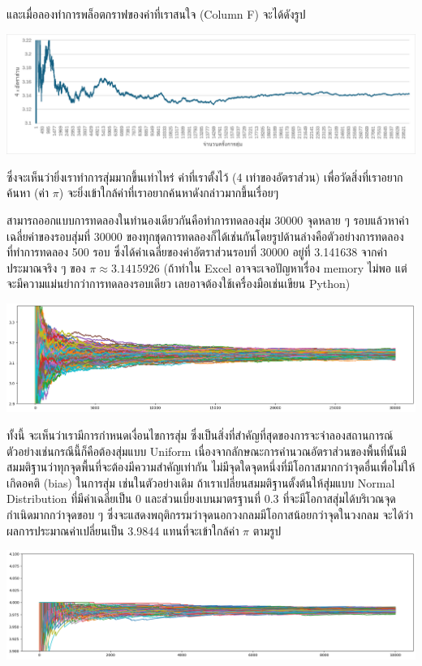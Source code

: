และเมื่อลองทำการพล็อตกราฟของค่าที่เราสนใจ (Column F) จะได้ดังรูป
\begin{center}
    \includegraphics[width=\linewidth]{ratioToPi.png}
\end{center}
ซึ่งจะเห็นว่ายิ่งเราทำการสุ่มมากขึ้นเท่าไหร่ ค่าที่เราตั้งไว้ (4 เท่าของอัตราส่วน) เพื่อวัดสิ่งที่เราอยากค้นหา (ค่า $\pi$) จะยิ่งเข้าใกล้ค่าที่เราอยากค้นหาดังกล่าวมากขึ้นเรื่อยๆ

สามารถออกแบบการทดลองในทำนองเดียวกันคือทำการทดลองสุ่ม 30000 จุดหลาย ๆ รอบแล้วหาค่าเฉลี่ยค่าของรอบสุ่มที่ 30000 ของทุกชุดการทดลองก็ได้เช่นกันโดยรูปด้านล่างคือตัวอย่างการทดลองที่ทำการทดลอง 500 รอบ ซึ่งได้ค่าเฉลี่ยของค่าอัตราส่วนรอบที่ 30000 อยู่ที่ 3.141638 จากค่าประมาณจริง ๆ ของ $\pi\approx 3.1415926$ (ถ้าทำใน Excel อาจจะเจอปัญหาเรื่อง memory ไม่พอ แต่จะมีความแม่นยำกว่าการทดลองรอบเดียว เลยอาจต้องใช้เครื่องมือเช่นเขียน Python)
\begin{center}
    \includegraphics[width=1\linewidth]{SimulatePi.png}
\end{center}

ทั้งนี้ จะเห็นว่าเรามีการกำหนดเงื่อนไขการสุ่ม ซึ่งเป็นสิ่งที่สำคัญที่สุดของการจะจำลองสถานการณ์ ตัวอย่างเช่นกรณีนี้ก็คือต้องสุ่มแบบ Uniform เนื่องจากลักษณะการคำนวณอัตราส่วนของพื้นที่นั้นมีสมมติฐานว่าทุกจุดพื้นที่จะต้องมีความสำคัญเท่ากัน ไม่มีจุดใดจุดหนึ่งที่มีโอกาสมากกว่าจุดอื่นเพื่อไม่ให้เกิดอคติ (bias) ในการสุ่ม เช่นในตัวอย่างเดิม ถ้าเราเปลี่ยนสมมติฐานตั้งต้นให้สุ่มแบบ Normal Distribution ที่มีค่าเฉลี่ยเป็น 0 และส่วนเบี่ยงเบนมาตรฐานที่ 0.3 ที่จะมีโอกาสสุ่มได้บริเวณจุดกำเนิดมากกว่าจุดขอบ ๆ ซึ่งจะแสดงพฤติกรรมว่าจุดนอกวงกลมมีโอกาสน้อยกว่าจุดในวงกลม จะได้ว่าผลการประมาณค่าเปลี่ยนเป็น 3.9844 แทนที่จะเข้าใกล้ค่า $\pi$ ตามรูป
\begin{center}
    \includegraphics[width=1\linewidth]{simulatePiWrong.png}
\end{center}

